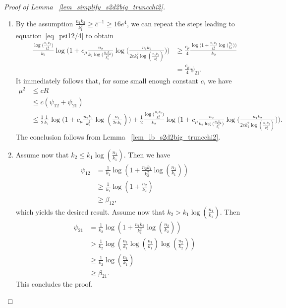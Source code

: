 \documentclass{article}
\begin{document}
\begin{proof}[Proof of Lemma ~\ref{lem_simplify_s2d2big_truncchi2}]
\phantom{}

\begin{enumerate}
    \item 
    By the assumption $\frac{n_1k_2}{k_1^2} \geq \bar{c}^{-1} \geq 16e^4$, 
    we can repeat the steps leading to equation~\eqref{eq_psi12/4} to obtain 
    \begin{align*}
         \frac{\log\big(\frac{n_1k_2}{k_1^2}\big)}{k_2}\log\Big(1 + c_\mu \frac{n_2}{k_2\log\big(\frac{n_1k_2}{k_1^2}\big)}\log \big(\frac{n_1k_2}{2ek_1^2\log(\frac{n_1k_2}{k_1^2})}\big)\Big)&\geq \frac{c_\mu}{4}\frac{\log\Big(1 + \frac{n_1k_2}{k_1^2}\log\big(\frac{n_2}{k_2}\big)\Big)}{k_2} \\
    &= \frac{c_\mu}{4} \psi_{21}.
    \end{align*}
    It immediately follows that, for some small enough constant $c$, we have 
    \begin{align*}
        \mu^2 &\leq cR \\
        &\leq c(\psi_{12} + \psi_{21}) \\
        &\leq \frac{1}{2}\frac{1}{k_1}\log\Big(1 + c_\mu \frac{n_2k_1}{k_2^2}\log(\frac{n_1}{2ek_1})\Big) + \frac12 \frac{\log\big(\frac{n_1k_2}{k_1^2}\big)}{k_2}\log\Big(1 + c_\mu \frac{n_2}{k_2\log\big(\frac{n_1k_2}{k_1^2}\big)}\log \big(\frac{n_1k_2}{2ek_1^2\log(\frac{n_1k_2}{k_1^2})}\big)\Big).
    \end{align*}
    The conclusion follows from Lemma ~\ref{lem_lb_s2d2big_truncchi2}.
    \item Assume now that $k_2 \leq k_1 \log\left(\frac{n_1}{k_1}\right)$. 
    Then we have
    \begin{align*}
        \psi_{12} &= \frac{1}{k_1} \log\left(1+\frac{n_2k_1}{k_2^2} \log\left(\frac{n_1}{k_1}\right)\right)\\
        & \geq \frac{1}{k_1} \log\left(1+\frac{n_2}{k_2} \right)\\
        & \geq \beta_{12}, 
    \end{align*}
    which yields the desired result. 
    Assume now that $k_2 > k_1 \log\left(\frac{n_1}{k_1}\right)$. 
    Then
    \begin{align*}
        \psi_{21} &= \frac{1}{k_2} \log\left(1+\frac{n_1k_2}{k_1^2} \log\left(\frac{n_2}{k_2}\right)\right)\\
        & > \frac{1}{k_2} \log\left(\frac{n_1}{k_1}\log\left(\frac{n_1}{k_1}\right)\log\left(\frac{n_2}{k_2}\right)\right)\\
        & \geq \frac{1}{k_2}\log\left(\frac{n_1}{k_1}\right)\\
        & \geq \beta_{21}.
    \end{align*}
    This concludes the proof.
    \end{enumerate}
\end{proof}
\end{document}
